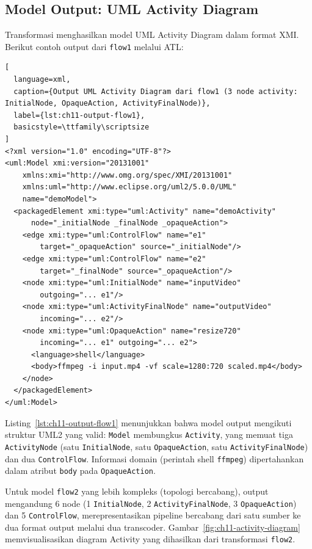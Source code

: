 \subsection{Model Output: UML Activity Diagram}

Transformasi menghasilkan model UML Activity Diagram dalam format XMI. Berikut contoh output dari \texttt{flow1} melalui ATL:

\begin{lstlisting}[
  language=xml,
  caption={Output UML Activity Diagram dari flow1 (3 node activity: InitialNode, OpaqueAction, ActivityFinalNode)},
  label={lst:ch11-output-flow1},
  basicstyle=\ttfamily\scriptsize
]
<?xml version="1.0" encoding="UTF-8"?>
<uml:Model xmi:version="20131001"
    xmlns:xmi="http://www.omg.org/spec/XMI/20131001"
    xmlns:uml="http://www.eclipse.org/uml2/5.0.0/UML"
    name="demoModel">
  <packagedElement xmi:type="uml:Activity" name="demoActivity"
      node="_initialNode _finalNode _opaqueAction">
    <edge xmi:type="uml:ControlFlow" name="e1"
        target="_opaqueAction" source="_initialNode"/>
    <edge xmi:type="uml:ControlFlow" name="e2"
        target="_finalNode" source="_opaqueAction"/>
    <node xmi:type="uml:InitialNode" name="inputVideo"
        outgoing="... e1"/>
    <node xmi:type="uml:ActivityFinalNode" name="outputVideo"
        incoming="... e2"/>
    <node xmi:type="uml:OpaqueAction" name="resize720"
        incoming="... e1" outgoing="... e2">
      <language>shell</language>
      <body>ffmpeg -i input.mp4 -vf scale=1280:720 scaled.mp4</body>
    </node>
  </packagedElement>
</uml:Model>
\end{lstlisting}

\noindent Listing~\ref{lst:ch11-output-flow1} menunjukkan bahwa model output mengikuti struktur UML2 yang valid: \texttt{Model} membungkus \texttt{Activity}, yang memuat tiga \texttt{ActivityNode} (satu \texttt{InitialNode}, satu \texttt{OpaqueAction}, satu \texttt{ActivityFinalNode}) dan dua \texttt{ControlFlow}. Informasi domain (perintah shell \texttt{ffmpeg}) dipertahankan dalam atribut \texttt{body} pada \texttt{OpaqueAction}.

Untuk model \texttt{flow2} yang lebih kompleks (topologi bercabang), output mengandung 6 node (1 \texttt{InitialNode}, 2 \texttt{ActivityFinalNode}, 3 \texttt{OpaqueAction}) dan 5 \texttt{ControlFlow}, merepresentasikan pipeline bercabang dari satu sumber ke dua format output melalui dua transcoder. Gambar~\ref{fig:ch11-activity-diagram} memvisualisasikan diagram Activity yang dihasilkan dari transformasi \texttt{flow2}.

